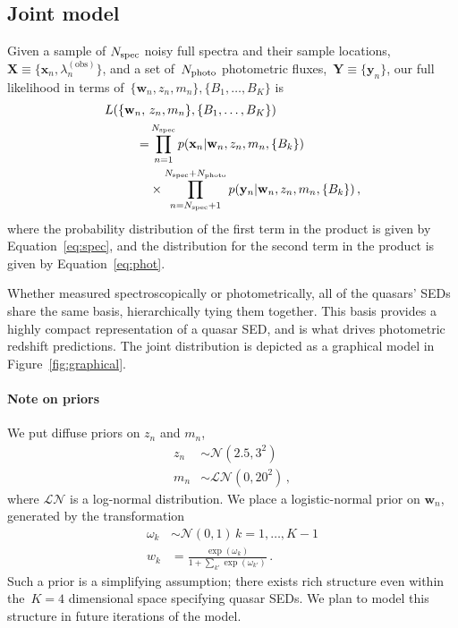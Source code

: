 \documentclass{article} %
\begin{document}
\subsection{Joint model}
Given a sample of ${N_{\text{spec}}}$ noisy full spectra and their sample locations, ${\mathbf{X} \equiv \{\mathbf{x}_n, \lambda^{(\text{obs})}_n \}}$, and a set of~${N_{\text{photo}}}$ photometric fluxes,~${\mathbf{Y} \equiv \{\mathbf{y}_n\}}$, our full likelihood in terms of~$\{ \mathbf{w}_n, z_n, m_n \}, \{ B_1, \dots, B_K \}$ is 
\begin{align*}
  L( \{ \mathbf{w}_n, ~&z_n, m_n \}, \{ B_1, \dots, B_K \} )  \\
    = & \prod_{n=1}^{N_{\text{spec}}} p( \mathbf{x}_n | \mathbf{w}_n, z_n, m_n, \{ B_k \})  \\
      & \times \prod_{n={N_{\text{spec}}}+1}^{{N_{\text{spec}}} + {N_{\text{photo}}}} p( \mathbf{y}_n | \mathbf{w}_n, z_n, m_n, \{ B_k \})\,,
\end{align*}
where the probability distribution of the first term in the product is given by Equation~\ref{eq:spec}, and the distribution for the second term in the product is given by Equation~\ref{eq:phot}.  

Whether measured spectroscopically or photometrically, all of the quasars' SEDs share the same basis, hierarchically tying them together.
This basis provides a highly compact representation of a quasar SED, and is what drives photometric redshift predictions.  
The joint distribution is depicted as a graphical model in Figure~\ref{fig:graphical}.

\paragraph{Note on priors}
We put diffuse priors on $z_n$ and $m_n$, 
\begin{align}
  z_n &\sim \mathcal{N}(2.5, 3^2) \\
  m_n &\sim \mathcal{LN}(0, 20^2) \, ,
\end{align}
where $\mathcal{LN}$ is a log-normal distribution.  We place a logistic-normal prior on $\mathbf{w}_n$, generated by the transformation 
\begin{align}
  \omega_k &\sim \mathcal{N}(0, 1) \, k = 1, \dots, K-1 \\
  w_k &= \frac{\exp(\omega_k)}{1 + \sum_{k'} \exp(\omega_{k'})} \, .
\end{align}
Such a prior is a simplifying assumption; there exists rich structure even within the~${K=4}$ dimensional space specifying quasar SEDs. 
We plan to model this structure in future iterations of the model.  
\end{document}
